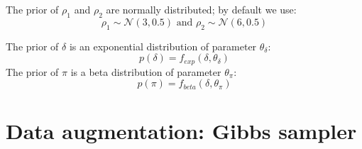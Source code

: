 \documentclass[a4paper,11pt]{article}
\begin{document}
The prior of $\rho_1$ and $\rho_2$ are normally distributed; by default we 
use:
\begin{equation}
\rho_1 \sim \mathcal{N}(3,0.5) \mbox{ and } \rho_2 \sim \mathcal{N}(6,0.5)
\end{equation}


The prior of $\delta$ is an exponential distribution of parameter 
$\theta_{\delta}$:
\begin{equation}
p(\delta) = f_{exp}(\delta,  \theta_{\delta})
\end{equation}
The prior of $\pi$ is a beta distribution of parameter 
$\theta_{\pi}$:
\begin{equation}
p(\pi) = f_{beta}(\delta,  \theta_{\pi})
\end{equation}





\section{Data augmentation: Gibbs sampler}
\end{document}
